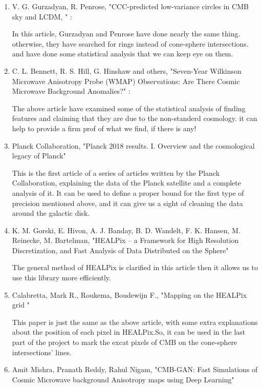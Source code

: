 \documentclass{article}
\begin{document}
\begin{multicols}{2}
\begin{enumerate}
\item 
V. G. Gurzadyan, R. Penrose, "CCC-predicted low-variance circles in CMB sky and LCDM, " :

In this article, Gurzadyan and Penrose have done nearly the same thing. otherwise, they have searched for rings instead of cone-sphere intersections. and have done some statistical analysis that we can keep eye on them.

\item
C. L. Bennett, R. S. Hill, G. Hinshaw and others, "Seven-Year Wilkinson Microwave Anisotropy Probe (WMAP) Observations: Are There Cosmic Microwave Background Anomalies?" :

The above article have examined some of the statistical analysis of finding features and claiming that they are due to the non-standerd cosmology. it can help to provide a firm prof of what we find, if there is any!

\item
Planck Collaboration, "Planck 2018 results. I. Overview and the cosmological legacy of Planck"

This is the first article of a series of articles written by the Planck Collaboration, explaining the data of the Planck satellite and a complete analysis of it. It can be used to define a proper bound for the first type of precision mentioned above, and it can give us a sight of cleaning the data around the galactic disk.

\item
K. M. Gorski, E. Hivon, A. J. Banday, B. D. Wandelt, F. K. Hansen, M. Reinecke, M. Bartelman, "HEALPix -- a Framework for High Resolution Discretization, and Fast Analysis of Data Distributed on the Sphere"

The general method of HEALPix is clarified in this article then it allows us to use this library more efficiently.

\item
 Calabretta, Mark R., Roukema, Boudewijn F., "Mapping on the HEALPix grid "
 
 This paper is just the same as the above article, with some extra explanations about the position of each pixel in HEALPix.So, it can be used in the last part of the project to mark the excat pixels of CMB on the cone-sphere intersections' lines.
 
\item
 Amit Mishra, Pranath Reddy, Rahul Nigam, "CMB-GAN: Fast Simulations of Cosmic Microwave background Anisotropy maps using Deep Learning"
 

\end{enumerate}
\end{multicols}
\end{document}
